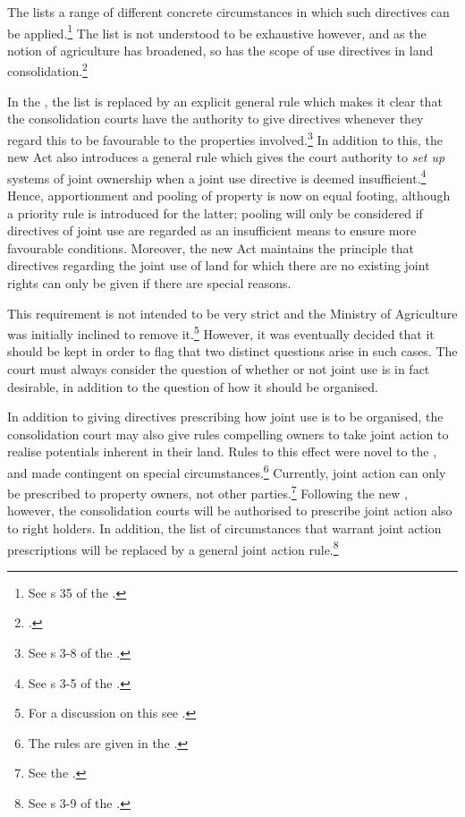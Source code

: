 The \cite{lca79} lists a range of different concrete circumstances in which such directives can be applied.\footnote{See s 35 of the \cite{lca79}.} The list is not understood to be exhaustive however, and as the notion of agriculture has broadened, so has the scope of use directives in land consolidation.\footcite[103]{otprp57}

In the \cite{lca13}, the list is replaced by an explicit general rule which makes it clear that the  consolidation courts have the authority to give directives whenever they regard this to be favourable to the properties involved.\footnote{See s 3-8 of the \cite{lca13}.} In addition to this, the new Act also introduces a general rule which gives the court authority to \emph{set up} systems of joint ownership when a joint use directive is deemed insufficient.\footnote{See s 3-5 of the \cite{lca13}.} Hence, apportionment and pooling of property is now on equal footing, although a priority rule is introduced for the latter; pooling will only be considered if directives of joint use are regarded as an insufficient means to ensure more favourable conditions. Moreover, the new Act maintains the principle that directives regarding the joint use of land for which there are no existing joint rights can only be given if there are special reasons.

This requirement is not intended to be very strict and the Ministry of Agriculture was initially inclined to remove it.\footnote{For a discussion on this see \cite[140-141]{prop12}.} However, it was eventually decided that it should be kept in order to flag that two distinct questions arise in such cases. The court must always consider the question of whether or not joint use is in fact desirable, in addition to the question of how it should be organised.

In addition to giving directives prescribing how joint use is to be organised, the consolidation court may also give rules compelling owners to take joint action to realise potentials inherent in their land. Rules to this effect were novel to the \cite{lca79}, and made contingent on special circumstances.\footnote{The rules are given in the \cite[2 e)|42-44]{lca79}.} Currently, joint action can only be prescribed to property owners, not other parties.\footnote{See the \cite[34 a)]{lca79}.} Following the new \cite{lca13}, however, the consolidation courts will be authorised to prescribe joint action also to right holders. In addition, the list of circumstances that warrant joint action prescriptions will be replaced by a general joint action rule.\footnote{See s 3-9 of the \cite{lca13}.}

